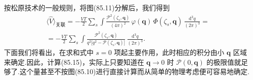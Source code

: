 按松原技术的一般规则，将图(85.11)分解后，我们得到
\begin{equation}
  \begin{aligned}
    \bigl\langle\hat{V}\bigr\rangle_{\text{关联}}=-\frac{VT}{2}\sum_{s}\int\frac{\mathcal{P}^{2}(\zeta_s,\bm{q})}{(4\pi)^{2}}\,\varphi(\bm{q})\,\varPhi(\zeta_s,\bm{q})\,\frac{\mathrm{d}^{3}q}{(2\pi)^{3}}=\\
    =-\frac{VT}{2}\sum_{s}\int\frac{\mathcal{P}^{2}(\zeta_s,\bm{q})}{q^{2}\bigl[q^{2}-\mathcal{P}(\zeta_s,\bm{q})\bigr]}\,\frac{\mathrm{d}^{3}q}{(2\pi)^{3}}.
  \end{aligned}
\end{equation}
下面我们将看出，在求和式中 $s=0$ 项起主要作用，此时相应的积分由小 $\bm{q}$ 区域来确定.因此，计算(85.15)，实际上只要知道在 $\bm{q}\to 0$ 时 $\mathcal{P}(0,\bm{q})$ 的极限值就足够了.这个量甚至不按图(85.10)进行直接计算而从简单的物理考虑便可容易地确定.

